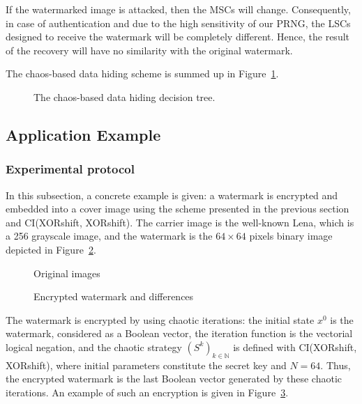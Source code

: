 \documentclass[journal]{IEEEtran}
\begin{document}
If the watermarked image is attacked, then the MSCs will change. Consequently, in case of authentication and due to the high sensitivity of our PRNG, the LSCs designed to receive the watermark will be completely different. Hence, the result of the recovery will have no similarity with the original watermark.

The chaos-based data hiding scheme is summed up in Figure~\ref{fig:organigramme}.

\begin{figure}[htb]
\centerline{}
\caption{The chaos-based data hiding decision tree.}
\label{fig:organigramme}
\end{figure}




\subsection{Application Example}

\subsubsection{Experimental protocol}


In this subsection, a concrete example is given: a watermark is encrypted and embedded into a cover image using the scheme presented in the previous section and CI(XORshift, XORshift). The carrier image is the well-known Lena, which is a 256 grayscale image, and the watermark is the $64\times 64$ pixels binary image depicted in Figure~\ref{Original images}.


\begin{figure}[!t]
\centering
{}
\hfil
{}
\caption{Original images}
\label{Original images}
\end{figure}


\begin{figure}[!t]
\centering
{}
\hfil
{}
\caption{Encrypted watermark and differences}
\label{Encrypted watermark and differences}
\end{figure}

The watermark is encrypted by using chaotic iterations: the initial state $x^{0}$ is the watermark, considered as a Boolean vector, the iteration function is the vectorial logical negation, and the chaotic strategy $(S^{k})_{k\in \mathds{N}}$ is defined with CI(XORshift, XORshift), where initial parameters constitute the secret key and $N=64$. Thus, the encrypted watermark is the last Boolean vector generated by these chaotic iterations. An example of such an encryption is given in Figure~\ref{Encrypted watermark and differences}.
\end{document}
